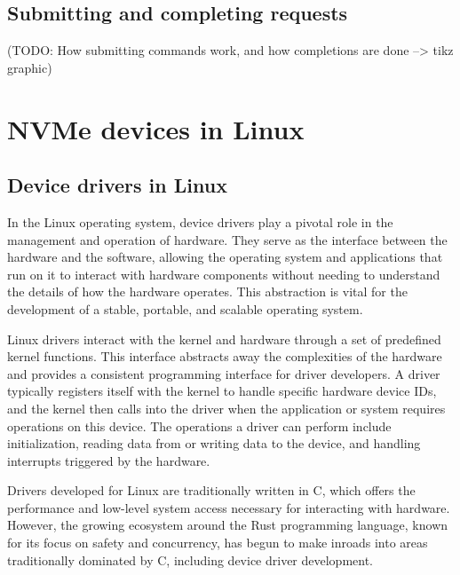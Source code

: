 \subsection{Submitting and completing requests}


(TODO: How submitting commands work, and how completions are done --> tikz graphic)

\section{NVMe devices in Linux}

\subsection{Device drivers in Linux}
In the Linux operating system, device drivers play a pivotal role in the management and operation of hardware. They serve as the interface between the hardware and the software, allowing the operating system and applications that run on it to interact with hardware components without needing to understand the details of how the hardware operates. This abstraction is vital for the development of a stable, portable, and scalable operating system.

Linux drivers interact with the kernel and hardware through a set of predefined kernel functions. This interface abstracts away the complexities of the hardware and provides a consistent programming interface for driver developers. A driver typically registers itself with the kernel to handle specific hardware device IDs, and the kernel then calls into the driver when the application or system requires operations on this device. The operations a driver can perform include initialization, reading data from or writing data to the device, and handling interrupts triggered by the hardware.

Drivers developed for Linux are traditionally written in C, which offers the performance and low-level system access necessary for interacting with hardware. However, the growing ecosystem around the Rust programming language, known for its focus on safety and concurrency, has begun to make inroads into areas traditionally dominated by C, including device driver development.


